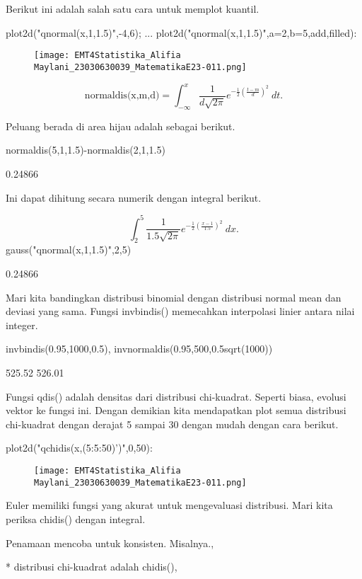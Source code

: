 \documentclass{article}
\begin{document}
Berikut ini adalah salah satu cara untuk memplot kuantil. 


\>plot2d("qnormal(x,1,1.5)",-4,6);  ...  
\>   plot2d("qnormal(x,1,1.5)",a=2,b=5,\>add,\>filled):


\begin{figure}
    \centering
    \texttt{[image: EMT4Statistika\_Alifia Maylani\_23030630039\_MatematikaE23-011.png]}
    \caption{}
    \label{fig:enter-label}
\end{figure}

$$\text{normaldis(x,m,d)}=\int_{-\infty}^x \frac{1}{d\sqrt{2\pi}}e^{-\frac{1}{2}(\frac{t-m}{d})^2}\ dt.$$

Peluang berada di area hijau adalah sebagai berikut.


\>normaldis(5,1,1.5)-normaldis(2,1,1.5)


    0.24866

Ini dapat dihitung secara numerik dengan integral berikut.


$$\int_2^5 \frac{1}{1.5\sqrt{2\pi}}e^{-\frac{1}{2}(\frac{x-1}{1.5})^2}\ dx.$$\>gauss("qnormal(x,1,1.5)",2,5)


    0.24866

Mari kita bandingkan distribusi binomial dengan distribusi normal mean
dan deviasi yang sama. Fungsi invbindis() memecahkan interpolasi
linier antara nilai integer.


\>invbindis(0.95,1000,0.5), invnormaldis(0.95,500,0.5\*sqrt(1000))


    525.52
    526.01

Fungsi qdis() adalah densitas dari distribusi chi-kuadrat. Seperti
biasa, evolusi vektor ke fungsi ini. Dengan demikian kita mendapatkan
plot semua distribusi chi-kuadrat dengan derajat 5 sampai 30 dengan
mudah dengan cara berikut.


\>plot2d("qchidis(x,(5:5:50)')",0,50):


\begin{figure}
    \centering
    \texttt{[image: EMT4Statistika\_Alifia Maylani\_23030630039\_MatematikaE23-011.png]}
    \caption{}
    \label{fig:enter-label}
\end{figure}

Euler memiliki fungsi yang akurat untuk mengevaluasi distribusi. Mari
kita periksa chidis() dengan integral.


Penamaan mencoba untuk konsisten. Misalnya.,


* 
distribusi chi-kuadrat adalah chidis(),
\end{document}
